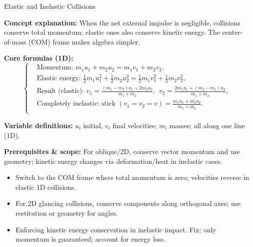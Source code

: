 \begin{KnowledgePoint}{Elastic and Inelastic Collisions \Core}
  \KPFormulas
  \begin{formulabox}
  \textbf{Concept explanation:} When the net external impulse is negligible, collisions conserve total momentum; elastic ones also conserve kinetic energy. The center-of-mass (COM) frame makes algebra simpler.

  \textbf{Core formulas (1D):}
  \[
  \left\{\begin{aligned}
    &\text{Momentum: } m_1u_1+m_2u_2=m_1v_1+m_2v_2,\\
    &\text{Elastic energy: } \tfrac12 m_1u_1^2+\tfrac12 m_2u_2^2=\tfrac12 m_1v_1^2+\tfrac12 m_2v_2^2,\\
    &\text{Result (elastic): } v_1=\frac{(m_1-m_2)u_1+2m_2u_2}{m_1+m_2},\ \ v_2=\frac{2m_1u_1+(m_2-m_1)u_2}{m_1+m_2},\\
    &\text{Completely inelastic: stick }(v_1=v_2=v)=\frac{m_1u_1+m_2u_2}{m_1+m_2}.\\
  \end{aligned}\right.
  \]

  \textbf{Variable definitions:} $u_i$ initial, $v_i$ final velocities; $m_i$ masses; all along one line (1D).

  

  \textbf{Prerequisites \& scope:} For oblique/2D, conserve vector momentum and use geometry; kinetic energy changes via deformation/heat in inelastic cases.
  \end{formulabox}

  \KPHeuristics
  \begin{heuristicsbox}
  \begin{itemize}[leftmargin=*]
    \item Switch to the COM frame where total momentum is zero; velocities reverse in elastic 1D collisions.
    \item For 2D glancing collisions, conserve components along orthogonal axes; use restitution or geometry for angles.
  \end{itemize}
  \vspace{0.4em}
  \begin{itemize}[leftmargin=*]
    \item Enforcing kinetic energy conservation in inelastic impact. Fix: only momentum is guaranteed; account for energy loss.
  \end{itemize}
  \end{heuristicsbox}


\end{KnowledgePoint}
